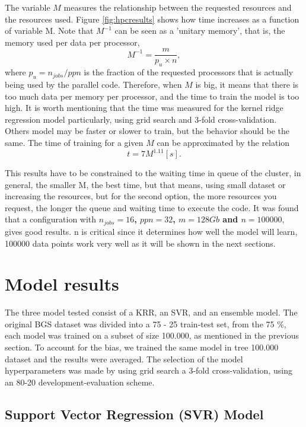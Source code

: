 The variable $M$ measures the relationship between the requested resources and the resources used. Figure \ref{fig:hpcresults} shows how time increases as a function of variable M. Note that $M^{-1}$ can be seen as a 'unitary memory', that is, the memory used per data per processor,
\begin{equation*}
M^{-1} = \frac{m}{p_u \times n},
\end{equation*}
where $p_u = n_{jobs}/ppn$ is the fraction of the requested processors that is actually being used by the parallel code. Therefore, when $M$ is big, it means that there is too much data per memory per processor, and the time to train the model is too high. It is worth mentioning that the time was measured for the kernel ridge regression model particularly, using grid search and 3-fold cross-validation. Others model may be faster or slower to train, but the behavior should be the same. The time of training for a given $M$ can be approximated by the relation
\begin{equation}
t = 7M^{1.11} [s].
\end{equation}

This results have to be constrained to the waiting time in queue of the cluster, in general, the smaller M, the best time, but that means, using small dataset or increasing the resources, but for the second option, the more resources you request, the longer the queue and waiting time to execute the code. It was found that a configuration with \textbf{$n_{jobs} = 16$, $ppn = 32$, $m = 128 Gb$ and $n = 100000$}, gives good results. n is critical since it determines how well the model will learn, 100000 data points work very well as it will be shown in the next sections.  

\section{Model results}

The three model tested consist of a KRR, an SVR, and an ensemble model. The original BGS dataset was divided into a 75 - 25 train-test set, from the 75 \%, each model was trained on a subset of size 100.000, as mentioned in the previous section. To account for the bias, we trained the same model in tree 100.000 dataset and the results were averaged. The selection of the model hyperparameters was made by using grid search a 3-fold cross-validation, using an 80-20 development-evaluation scheme. 

\subsection{Support Vector Regression (SVR) Model}

